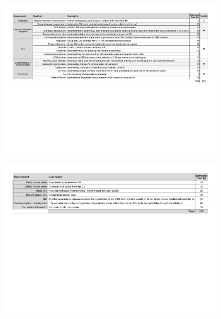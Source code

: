 \begin{landscape}
\begin{figure}[h!]
 \includegraphics[width=\paperwidth]{externaldocuments/Requirements_OBDCU-ENG1_Requirements_Elicitation.pdf} 
\end{figure}
\end{landscape}
\begin{landscape}
\begin{figure}[h!]
 \includegraphics[width=\paperwidth]{externaldocuments/Requirements_OBDTool-ACQ11_Technical_Requirements.pdf}
\end{figure} 
\end{landscape}
